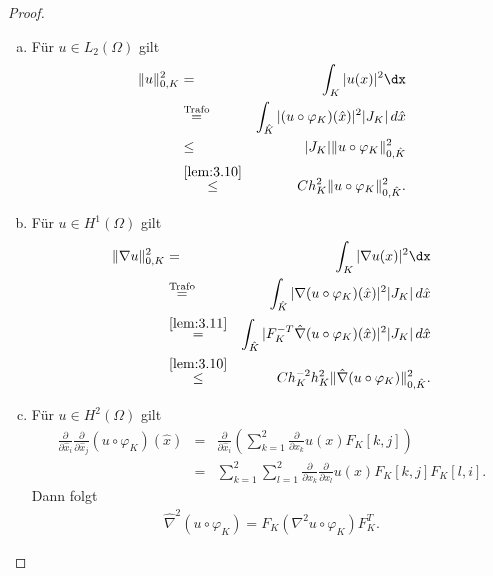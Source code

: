 \begin{proof}
    \begin{enumerate}[a)]
      \item
        Für $u \in L_2(\Omega)$ gilt
        \begin{eqnarray*}
                \|u\|_{0,K}^2
            &=& \int_K |u(x)|^2 \dx \\
            &\stackrel{\text{Trafo}}{=}&
                \int_{\hat K} |(u \circ \varphi_K)(\hat x)|^2 |J_K| \,d\hat x \\
            &\le& |J_K| \|u \circ \varphi_K\|_{0,\hat K}^2 \\
            &\stackrel{\eqref{lem:3.10}}{\le}&
                C h_K^2 \|u \circ \varphi_K\|_{0,\hat K}^2.
        \end{eqnarray*}
      \item
        Für $u \in H^1(\Omega)$ gilt
        \begin{eqnarray*}
                \|\nabla u\|_{0,K}^2
            &=& \int_K |\nabla u(x)|^2 \dx \\
            &\stackrel{\text{Trafo}}{=}&
                \int_{\hat K} |\nabla (u \circ \varphi_K)(\hat x)|^2 |J_K|
                \,d\hat x \\
            &\stackrel{\eqref{lem:3.11}}{=}&
                \int_{\hat K} |F_K^{-T} \hat \nabla (u \circ \varphi_K)
                (\hat x)|^2 |J_K| \,d\hat x \\
            &\stackrel{\eqref{lem:3.10}}{\le}&
                C h_K^{-2} h_K^2 \|\hat \nabla (u \circ \varphi_K)\|_{0,\hat K}
                ^2.
        \end{eqnarray*}
      \item
         Für $u \in H^2(\Omega)$ gilt
        \begin{eqnarray*}
                \frac{\partial}{\partial \hat x_i} \frac{\partial}
                {\partial \hat x_j}(u \circ \varphi_K)(\hat x)
            &=& \frac{\partial}{\partial \hat x_i}
                \left(\sum_{k=1}^2 \frac{\partial}{\partial x_k} u(x) F_K[k,j]
                \right) \\
            &=& \sum_{k=1}^2 \sum_{l=1}^2 \frac{\partial}{\partial x_k}
                \frac{\partial}{\partial x_l} u(x) F_K[k,j] F_K[l,i].
        \end{eqnarray*}
        Dann folgt
        \begin{eqnarray*}
            \hat \nabla^2 (u \circ \varphi_K) = F_K (\nabla^2 u \circ \varphi_K) F_K^T.
        \end{eqnarray*}

\end{enumerate}
\end{proof}
